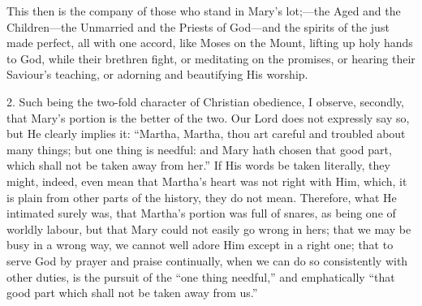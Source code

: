 This then is the company of those who stand in Mary's lot;—the
Aged and the Children—the Unmarried and the Priests of God—and the
spirits of the just made perfect, all with one accord, like Moses on
the Mount, lifting up holy hands to God, while their brethren fight,
or meditating on the promises, or hearing their Saviour's teaching,
or adorning and beautifying His worship.

2. Such being the two-fold character of Christian obedience, I
observe, secondly, that Mary's portion is the better of the two. Our
Lord does not expressly say so, but He clearly implies it:
``Martha, Martha, thou art careful and troubled about many things;
but one thing is needful: and Mary hath chosen that good part, which
shall not be taken away from her.'' If His words be taken
literally, they might, indeed, even mean that Martha's heart was not
right with Him, which, it is plain from other parts of the history,
they do not mean. Therefore, what He intimated surely was, that Martha's
portion was full of snares, as being one of worldly labour, but that
Mary could not easily go wrong in hers; that we may be busy in a wrong
way, we cannot well adore Him except in a right one; that to serve God
by prayer and praise continually, when we can do so consistently with
other duties, is the pursuit of the ``one thing needful,'' and
emphatically ``that good part which shall not be taken away from
us.''

